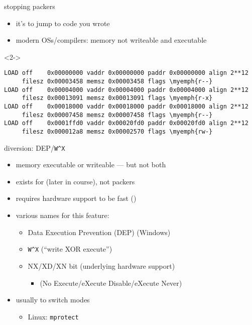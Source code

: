 
\begin{frame}[fragile]{stopping packers}
    \begin{itemize}
    \item it's  to jump to code you wrote
    \item modern OSs/compilers: memory not writeable and executable
    \end{itemize}
\vspace{.5cm}
\begin{visibleenv}<2->
\begin{Verbatim}[fontsize=\fontsize{10}{11}\selectfont,commandchars=\\\{\}]
LOAD off    0x00000000 vaddr 0x00000000 paddr 0x00000000 align 2**12
     filesz 0x00003458 memsz 0x00003458 flags \myemph{r--}
LOAD off    0x00004000 vaddr 0x00004000 paddr 0x00004000 align 2**12
     filesz 0x00013091 memsz 0x00013091 flags \myemph{r-x}
LOAD off    0x00018000 vaddr 0x00018000 paddr 0x00018000 align 2**12
     filesz 0x00007458 memsz 0x00007458 flags \myemph{r--}
LOAD off    0x0001ffd0 vaddr 0x00020fd0 paddr 0x00020fd0 align 2**12
     filesz 0x000012a8 memsz 0x00002570 flags \myemph{rw-}
\end{Verbatim}
\end{visibleenv}
\end{frame}

\begin{frame}{diversion: DEP/{\tt W\textasciicircum X}}
    \begin{itemize}
    \item memory executable or writeable --- but not both
    \item exists for  (later in course), not packers
    \item requires hardware support to be fast ()
    \item various names for this feature:
        \begin{itemize}
        \item Data Execution Prevention (DEP) (Windows)
        \item {\tt W\textasciicircum X} (``write XOR execute'')
        \item NX/XD/XN bit  (underlying hardware support)
            \begin{itemize}
            \item (No Execute/eXecute Disable/eXecute Never)
            \end{itemize}
        \end{itemize}
    \item usually  to switch modes
        \begin{itemize}
        \item Linux: \texttt{mprotect}
        \end{itemize}
    \end{itemize}
\end{frame}

